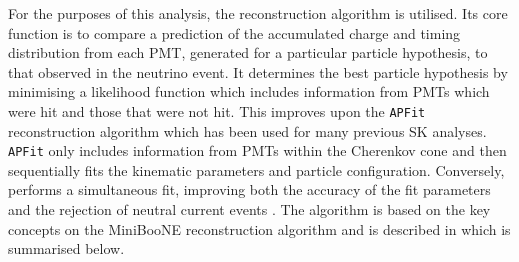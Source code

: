 For the purposes of this analysis, the \fq reconstruction algorithm is utilised. Its core function is to compare a prediction of the accumulated charge and timing distribution from each PMT, generated for a particular particle hypothesis, to that observed in the neutrino event. It determines the best particle hypothesis by minimising a likelihood function which includes information from PMTs which were hit and those that were not hit. This improves upon the \texttt{APFit} reconstruction algorithm which has been used for many previous SK analyses. \texttt{APFit} only includes information from PMTs within the \quickmath{43\deg} Cherenkov cone and then sequentially fits the kinematic parameters and particle configuration. Conversely, \fq performs a simultaneous fit, improving both the accuracy of the fit parameters and the rejection of neutral current  events \cite{Abe2018, Abe2015}. The \fq algorithm is based on the key concepts on the MiniBooNE reconstruction algorithm \cite{Patterson_2009} and is described in \cite{t2k_tn_146} which is summarised below.

